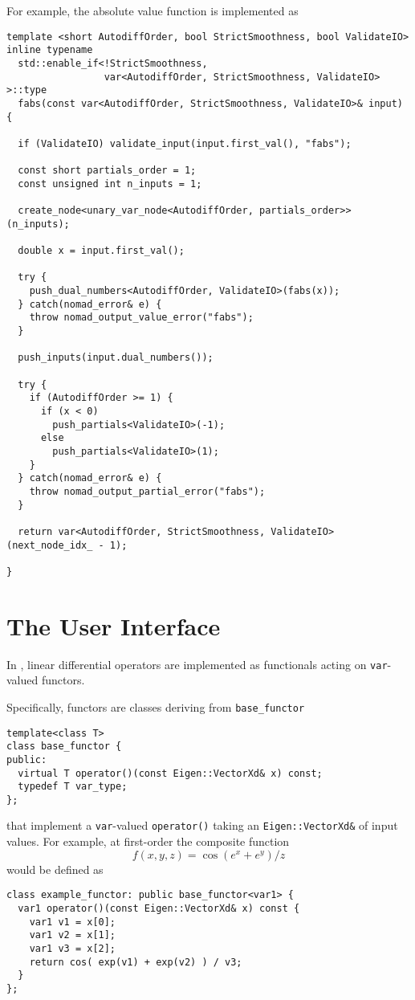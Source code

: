 For example, the absolute value function is implemented as
%
\begin{verbatim}
template <short AutodiffOrder, bool StrictSmoothness, bool ValidateIO>
inline typename 
  std::enable_if<!StrictSmoothness, 
                 var<AutodiffOrder, StrictSmoothness, ValidateIO> >::type
  fabs(const var<AutodiffOrder, StrictSmoothness, ValidateIO>& input) {
    
  if (ValidateIO) validate_input(input.first_val(), "fabs");
      
  const short partials_order = 1;
  const unsigned int n_inputs = 1;
    
  create_node<unary_var_node<AutodiffOrder, partials_order>>(n_inputs);

  double x = input.first_val();
    
  try {
    push_dual_numbers<AutodiffOrder, ValidateIO>(fabs(x));
  } catch(nomad_error& e) {
    throw nomad_output_value_error("fabs");
  }
      
  push_inputs(input.dual_numbers());
    
  try {
    if (AutodiffOrder >= 1) {
      if (x < 0)
        push_partials<ValidateIO>(-1);
      else
        push_partials<ValidateIO>(1);
    }
  } catch(nomad_error& e) {
    throw nomad_output_partial_error("fabs");
  }

  return var<AutodiffOrder, StrictSmoothness, ValidateIO>(next_node_idx_ - 1);
    
}
\end{verbatim}

\section{The \nomad User Interface}

In \nomad, linear differential operators are implemented as functionals acting
on \verb|var|-valued functors.

Specifically, functors are classes deriving from \verb|base_functor|
%
\begin{verbatim}
template<class T>
class base_functor {
public:
  virtual T operator()(const Eigen::VectorXd& x) const;
  typedef T var_type;
};
\end{verbatim}
%
that implement a \verb|var|-valued \verb|operator()| taking an
\verb|Eigen::VectorXd&| of input values.  For example, at
first-order the composite function
%
\begin{equation*}
f \! \left( x, y, z \right) = \cos \! \left( e^{x} + e^{y} \right) / z
\end{equation*}
%
would be defined as
%
\begin{verbatim}
class example_functor: public base_functor<var1> {
  var1 operator()(const Eigen::VectorXd& x) const {
    var1 v1 = x[0];
    var1 v2 = x[1];
    var1 v3 = x[2];
    return cos( exp(v1) + exp(v2) ) / v3;  
  }
};
\end{verbatim}


